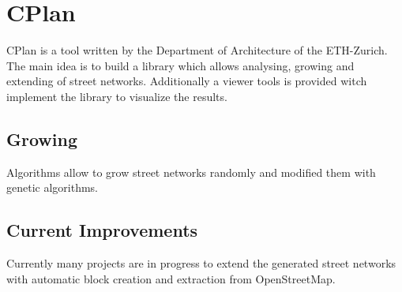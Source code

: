 \section{CPlan}
\label{CPlan}
CPlan is a tool written by the Department of Architecture of the ETH-Zurich. The main idea is to build a library which allows analysing, growing and extending of street networks. Additionally a viewer tools is provided witch implement the library to visualize the results. \citep{cPlan:2015}

\subsection{Growing}
Algorithms allow to grow street networks randomly and modified them with genetic algorithms.

\subsection{Current Improvements}
Currently many projects are in progress to extend the generated street networks with automatic block creation and extraction from OpenStreetMap.